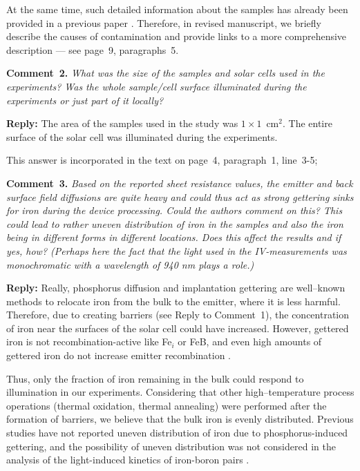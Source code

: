 \documentclass{WileyMSP-template}
\begin{document}
At the same time, such detailed information about the samples has already been provided in a previous paper \cite{Olikh2021JAP}.
Therefore, in revised manuscript, we briefly describe the causes of contamination and provide links
to a more comprehensive description --- see page~9, paragraphs~5.


\vspace{1cm}
\noindent
\textcolor[rgb]{0.00,0.50,1.00}{\textbf{Comment~2.}}
\emph{What was the size of the samples and solar cells used in the experiments?
Was the whole sample/cell surface illuminated during the experiments or just part of it locally?}

\noindent
\textcolor[rgb]{0.51,0.00,0.00}{\textbf{Reply:}}
The area of the samples used in the study was $1\times1$~cm$^2$.
The entire surface of the solar cell was illuminated during the experiments.

This answer is incorporated in the text on page~4, paragraph~1, line~3-5;


\vspace{1cm}
\noindent
\textcolor[rgb]{0.00,0.50,1.00}{\textbf{Comment~3.}}
\emph{Based on the reported sheet resistance values,
the emitter and back surface field diffusions are quite heavy and could thus act as strong gettering sinks for iron during the device processing.
Could the authors comment on this?
This could lead to rather uneven distribution of iron in the samples and also the iron being in different forms in different locations.
Does this affect the results and if yes, how?
(Perhaps here the fact that the light used in the IV-measurements was monochromatic with a wavelength of 940 nm plays a role.)}

\noindent
\textcolor[rgb]{0.51,0.00,0.00}{\textbf{Reply:}}
Really, phosphorus diffusion \cite{FeB:Vahanissi} and implantation \cite{LaineIEEEPV2016,FeBKin2019} gettering
are well--known methods to relocate iron from the bulk to the emitter, where it is less harmful.
Therefore, due to creating barriers (see Reply to Comment~1), the concentration of iron near the surfaces of the solar cell could have increased.
However, gettered iron is not recombination-active like
Fe$_i$ or FeB, and even high amounts of gettered iron do not increase emitter recombination \cite{FeB:Vahanissi}.

Thus, only the fraction of iron remaining in the bulk could respond to illumination in our experiments.
Considering that other high--temperature process operations (thermal oxidation, thermal annealing) were performed after the formation of barriers,
we believe that the bulk iron is evenly distributed.
Previous studies have not reported uneven distribution of iron due to phosphorus-induced gettering,
and the possibility of uneven distribution was not considered in the analysis of the light-induced kinetics of iron-boron pairs \cite{LaineIEEEPV2016,FeBKin2019}.
\end{document}
